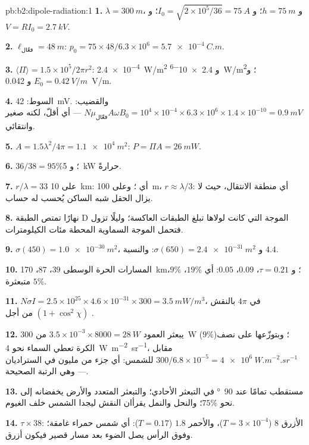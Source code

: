 \begin{solution}{pb:b2:dipole-radiation:1}
\textbf{1.} $\lambda = \qty{300}{m}$، و $h = \qty{75}{m}$؛ و $I_0 = \sqrt{2 \times 10^5/36} = \qty{75}{A}$؛
و $V = RI_0 = \qty{2.7}{kV}$.

\textbf{2.} $\ell_{\text{فعّال}} = \qty{48}{m}$: $p_0 = 75 \times 48/6.3 \times 10^6 = \qty{5.7e-4}{C.m}$.

\textbf{3.} $\langle\Pi\rangle = 1.5 \times 10^5/2\pi r^2$: \qty{2.4e-4}{W/m^2} و \qty{2.4e-6}{W/m^2}؛
و $E_0 = \qty{0.42}{V/m}$ و \qty{0.042}{V/m}.

\textbf{4.} السوط: \qty{42}{mV}. والقضيب: $N\mu_{\text{فعّال}}A\omega B_0 = 10^4 \times 10^{-4} \times 6.3 \times
10^6 \times 1.4 \times 10^{-10} = \qty{0.9}{mV}$ --- أي أقلّ، لكنه صغير وانتقائي.

\textbf{5.} $A = 1.5\lambda^2/4\pi = \qty{1.1e4}{m^2}$: $P = \Pi A = \qty{26}{mW}$.

\textbf{6.} $36/38 = 95\%$؛ و \qty{5}{kW} حرارةً.

\textbf{7.} $r/\lambda = 33$ على \qty{10}{km}: أي ؛ وعلى \qty{100}{m}،
$r \approx \lambda/3$: أي منطقة الانتقال، حيث لا يزال الحقل شبه الساكن
يُحسب له حساب.

\textbf{8.} نهارًا تمتص الطبقة D الموجة التي كانت لولاها
تبلغ الطبقات العاكسة؛ وليلًا تزول فتحمل الموجة السماوية
المحطة مئات الكيلومترات.

\textbf{9.} $\sigma(450) = \qty{1.0e-30}{m^2}$، و $\sigma(650) = \qty{2.4e-31}{m^2}$: والنسبة $4.4$.

\textbf{10.} المسارات الحرة الوسطى $39$، $87$، \qty{170}{km}؛ و $\tau = 0.21$، $0.09$، $0.05$:
أي $19\%$، $9\%$، $5\%$ متبعثرة.

\textbf{11.} $N\sigma I = 2.5 \times 10^{25} \times 4.6 \times 10^{-31} \times 300 = \qty{3.5}{mW/m^3}$،
في $4\pi$ بالنقش $(1 + \cos^2\chi)$ من أجل .

\textbf{12.} يبعثر العمود $3.5 \times 10^{-3} \times 8000 = \qty{28}{W}$ من
\qty{300}{W} ($9\%$)؛ وبتوزّعها على نصف الكرة تعطي السماء نحو
\qty{4}{W.m^{-2}.sr^{-1}}، مقابل $300/6.8 \times 10^{-5} = \qty{4e6}{W.m^{-2}.sr^{-1}}$ للشمس:
أي جزء من مليون في الستراديان --- وهي الرتبة الصحيحة.

\textbf{13.} مستقطب تمامًا عند \qty{90}{\degree} في التبعثر الأحادي؛ والتبعثر
المتعدد والأرض يخفضانه إلى نحو $75\%$؛ والنحل والنمل يقرأان
النقش ليجدا الشمس خلف الغيوم.

\textbf{14.} $\tau \times 38$: الأزرق $8$ ($T = 3 \times 10^{-4}$)، والأحمر $1.8$ ($T = 0.17$): أي شمس
حمراء غامقة؛ وفوق الرأس يصل الضوء بعد مسار قصير فيكون أزرق.


\end{solution}
